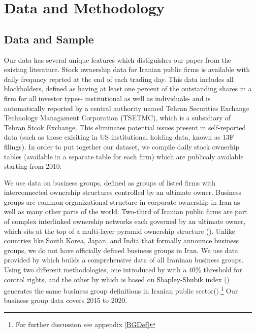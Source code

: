 
\section{{Data and Methodology}}



\subsection{{Data and Sample}}



Our data has several unique features which distiguishes our paper from the existing literature. Stock ownership data for Iranian public firms is available with daily frequncy reprted at the end of each trading day. This data includes all blockholders, defined as having at least one percent of the outstanding shares in a firm for all investor types- institutional as well as individuals- and is automatically reported by a central authority named Tehran Securities Exchange Technology Managament Corporation (TSETMC), which is a subsidiary of Tehran Stcok Exchange. This eliminates potential issues present in self-reported data (such as those exisiting in US institutional holding data, known as 13F filings). In order to put together our dataset, we compile daily stock ownerhip tables (available in a separate table for each firm) which are publicaly available starting from 2010.


We use data on business groups, defined as groups of listed firms with interconnected ownership structures controlled by an ultimate owner. Business groups are common organizational structure in corporate ownership in Iran as well as many other parts of the world. Two-third of Iranian public firms are part of complex interlinked ownership networks each governed by an ultimate owner, which sits at the top of a multi-layer pyramid ownership structure ({\cite{Aliabadi2022}}). Unlike countries like South Korea, Japan, and India that formally announce business groups, we do not have officially defined business groups in Iran. We use data provided by {\cite{Aliabadi2022}} which builds a comprehensive data of all Iraninan business groups.  Using two different methodologies, one introduced by \cite{almeida2011structure} with a 40\% threshold for control rights, and the other by \cite{aminadav2011rebuilding} which is based on Shapley-Shubik index (\cite{shapley1954method}) generates the same business group definitions in Iranian public sector({\cite{Aliabadi2022}}).\footnote{For further discussion see appendix \ref{BGDef}} Our business group data covers 2015 to 2020. 



